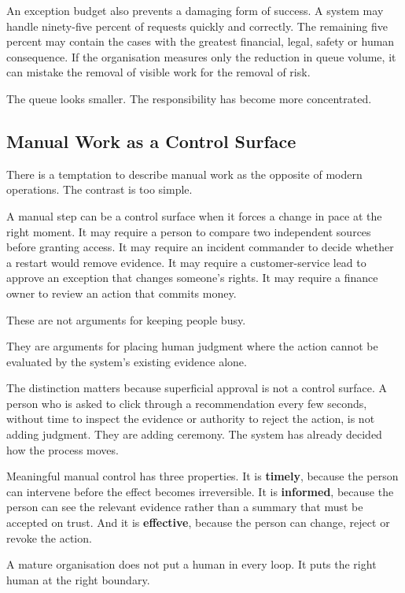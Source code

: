 An exception budget also prevents a damaging form of success. A system
may handle ninety-five percent of requests quickly and correctly. The
remaining five percent may contain the cases with the greatest
financial, legal, safety or human consequence. If the organisation
measures only the reduction in queue volume, it can mistake the removal
of visible work for the removal of risk.

The queue looks smaller. The responsibility has become more
concentrated.

\subsection{Manual Work as a Control
Surface}\label{manual-work-as-a-control-surface}

There is a temptation to describe manual work as the opposite of modern
operations. The contrast is too simple.

A manual step can be a control surface when it forces a change in pace
at the right moment. It may require a person to compare two independent
sources before granting access. It may require an incident commander to
decide whether a restart would remove evidence. It may require a
customer-service lead to approve an exception that changes someone's
rights. It may require a finance owner to review an action that commits
money.

These are not arguments for keeping people busy.

They are arguments for placing human judgment where the action cannot be
evaluated by the system's existing evidence alone.

The distinction matters because superficial approval is not a control
surface. A person who is asked to click through a recommendation every
few seconds, without time to inspect the evidence or authority to reject
the action, is not adding judgment. They are adding ceremony. The system
has already decided how the process moves.

Meaningful manual control has three properties. It is \textbf{timely},
because the person can intervene before the effect becomes irreversible.
It is \textbf{informed}, because the person can see the relevant
evidence rather than a summary that must be accepted on trust. And it is
\textbf{effective}, because the person can change, reject or revoke the
action.

A mature organisation does not put a human in every loop. It puts the
right human at the right boundary.

